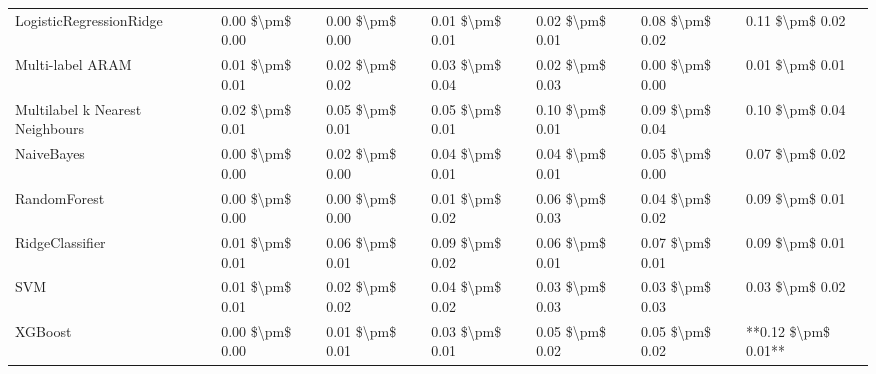\begin{tabular}{lllllll}
        LogisticRegressionRidge & 0.00 \$\textbackslash pm\$ 0.00 &           0.00 \$\textbackslash pm\$ 0.00 &       0.01 \$\textbackslash pm\$ 0.01 &        0.02 \$\textbackslash pm\$ 0.01 &                         0.08 \$\textbackslash pm\$ 0.02 &     0.11 \$\textbackslash pm\$ 0.02 \\
               Multi-label ARAM & 0.01 \$\textbackslash pm\$ 0.01 &           0.02 \$\textbackslash pm\$ 0.02 &       0.03 \$\textbackslash pm\$ 0.04 &        0.02 \$\textbackslash pm\$ 0.03 &                         0.00 \$\textbackslash pm\$ 0.00 &     0.01 \$\textbackslash pm\$ 0.01 \\
Multilabel k Nearest Neighbours & 0.02 \$\textbackslash pm\$ 0.01 &           0.05 \$\textbackslash pm\$ 0.01 &       0.05 \$\textbackslash pm\$ 0.01 &        0.10 \$\textbackslash pm\$ 0.01 &                         0.09 \$\textbackslash pm\$ 0.04 &     0.10 \$\textbackslash pm\$ 0.04 \\
                     NaiveBayes & 0.00 \$\textbackslash pm\$ 0.00 &           0.02 \$\textbackslash pm\$ 0.00 &       0.04 \$\textbackslash pm\$ 0.01 &        0.04 \$\textbackslash pm\$ 0.01 &                         0.05 \$\textbackslash pm\$ 0.00 &     0.07 \$\textbackslash pm\$ 0.02 \\
                   RandomForest & 0.00 \$\textbackslash pm\$ 0.00 &           0.00 \$\textbackslash pm\$ 0.00 &       0.01 \$\textbackslash pm\$ 0.02 &        0.06 \$\textbackslash pm\$ 0.03 &                         0.04 \$\textbackslash pm\$ 0.02 &     0.09 \$\textbackslash pm\$ 0.01 \\
                RidgeClassifier & 0.01 \$\textbackslash pm\$ 0.01 &           0.06 \$\textbackslash pm\$ 0.01 &       0.09 \$\textbackslash pm\$ 0.02 &        0.06 \$\textbackslash pm\$ 0.01 &                         0.07 \$\textbackslash pm\$ 0.01 &     0.09 \$\textbackslash pm\$ 0.01 \\
                            SVM & 0.01 \$\textbackslash pm\$ 0.01 &           0.02 \$\textbackslash pm\$ 0.02 &       0.04 \$\textbackslash pm\$ 0.02 &        0.03 \$\textbackslash pm\$ 0.03 &                         0.03 \$\textbackslash pm\$ 0.03 &     0.03 \$\textbackslash pm\$ 0.02 \\
                        XGBoost & 0.00 \$\textbackslash pm\$ 0.00 &           0.01 \$\textbackslash pm\$ 0.01 &       0.03 \$\textbackslash pm\$ 0.01 &        0.05 \$\textbackslash pm\$ 0.02 &                         0.05 \$\textbackslash pm\$ 0.02 & **0.12 \$\textbackslash pm\$ 0.01** \\
\bottomrule
\end{tabular}
